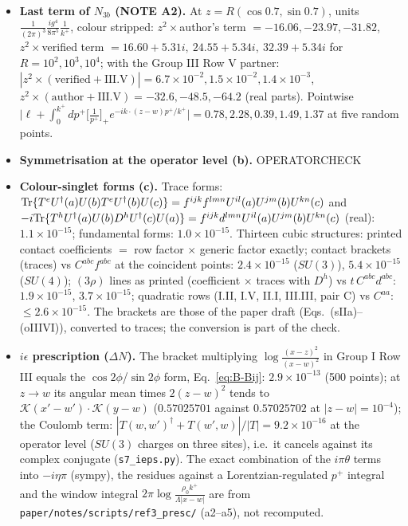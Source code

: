 \begin{itemize}
\item \textbf{Last term of $N_{3b}$ (NOTE A2).} At $z=R(\cos0.7,\sin0.7)$, units $\frac{1}{(2\pi)^{3}}\frac{ig^{4}}{8\pi^{5}}\frac{1}{k^{+}}$, colour stripped: $z^{2}\times$author's term $=-16.06,-23.97,-31.82$, $z^{2}\times$verified term $=16.60+5.31i,\ 24.55+5.34i,\ 32.39+5.34i$ for $R=10^{2},10^{3},10^{4}$; with the Group III Row V partner: $|z^{2}\times(\text{verified}+\text{III.V})|=6.7\times10^{-2},1.5\times10^{-2},1.4\times10^{-3}$, $z^{2}\times(\text{author}+\text{III.V})=-32.6,-48.5,-64.2$ (real parts). Pointwise $\big|\ell+\int_{0}^{k^{+}}dp^{+}\big[\frac{1}{p^{+}}\big]_{+}e^{-ik\cdot(z-w)p^{+}/k^{+}}\big|=0.78,2.28,0.39,1.49,1.37$ at five random points.
\item \textbf{Symmetrisation at the operator level (b).} OPERATORCHECK
\item \textbf{Colour-singlet forms (c).} Trace forms: ${\rm Tr}\{T^{e}U^{\dagger}(a)U(b)T^{e}U^{\dagger}(b)U(c)\}=f^{ijk}f^{lmn}U^{il}(a)U^{jm}(b)U^{kn}(c)$ and $-i{\rm Tr}\{T^{h}U^{\dagger}(a)U(b)D^{h}U^{\dagger}(c)U(a)\}=f^{ijk}d^{lmn}U^{il}(a)U^{jm}(b)U^{kn}(c)$ (real): $1.1\times10^{-15}$; fundamental forms: $1.0\times10^{-15}$. Thirteen cubic structures: printed contact coefficients $=$ row factor $\times$ generic factor exactly; contact brackets (traces) vs $C^{abc}f^{abc}$ at the coincident points: $2.4\times10^{-15}$ ($SU(3)$), $5.4\times10^{-15}$ ($SU(4)$); $(3\rho)$ lines as printed (coefficient $\times$ traces with $D^{h}$) vs $t\,C^{abc}d^{abc}$: $1.9\times10^{-15}$, $3.7\times10^{-15}$; quadratic rows (I.II, I.V, II.I, III.III, pair C) vs $C^{aa}$: $\le2.6\times10^{-15}$. The brackets are those of the paper draft (Eqs.~(sIIa)--(oIIIVI)), converted to traces; the conversion is part of the check.
\item \textbf{$i\epsilon$ prescription ($\Delta N$).} The bracket multiplying $\log\frac{(x-z)^{2}}{(x-w)^{2}}$ in Group I Row III equals the $\cos2\phi$/$\sin2\phi$ form, Eq.~\eqref{eq:B-Bij}: $2.9\times10^{-13}$ (500 points); at $z\to w$ its angular mean times $2(z-w)^{2}$ tends to $\mathcal{K}(x'-w')\cdot\mathcal{K}(y-w)$ ($0.57025701$ against $0.57025702$ at $|z-w|=10^{-4}$); the Coulomb term: $|T(w,w')^{\dagger}+T(w',w)|/|T|=9.2\times10^{-16}$ at the operator level ($SU(3)$ charges on three sites), i.e.\ it cancels against its complex conjugate (\texttt{s7\_ieps.py}). The exact combination of the $i\pi\theta$ terms into $-i\eta\pi$ (sympy), the residues against a Lorentzian-regulated $p^{+}$ integral and the window integral $2\pi\log\frac{\rho_{0}k^{+}}{\Lambda|x-w|}$ are from \texttt{paper/notes/scripts/ref3\_presc/} (a2--a5), not recomputed.

\end{itemize}
